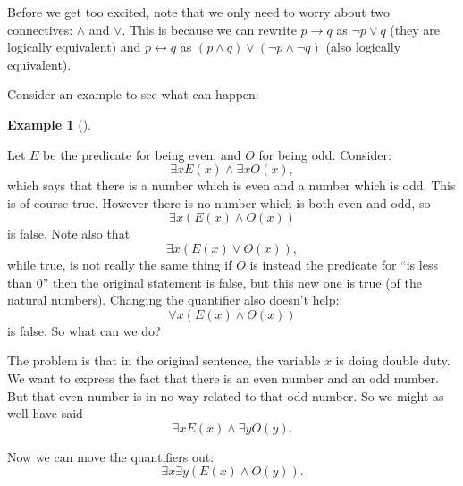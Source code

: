 \documentclass[10pt,]{book}
\theoremstyle{plain}
\theoremstyle{definition}
\newtheorem{example}[theorem]{Example}
\theoremstyle{definition}
\theoremstyle{definition}
\numberwithin{equation}{chapter}
\def\iff{\leftrightarrow}
\def\imp{\rightarrow}
\begin{document}
      Before we get too excited, note that we only need to worry about two connectives: \(\wedge\) and \(\vee\). This is because we can rewrite \(p \imp q\) as \(\neg p \vee q\) (they are logically equivalent) and \(p \iff q\) as \((p \wedge q) \vee (\neg p \wedge \neg q)\) (also logically equivalent).
\par

      Consider an example to see what can happen:
\begin{example}[]\label{example-87}

          Let \(E\) be the predicate for being even, and \(O\) for being odd. Consider:
          \begin{equation*}
            \exists x E(x) \wedge \exists x O(x),
          \end{equation*}
          which says that there is a number which is even and a number which is odd. This is of course true. However there is no number which is both even and odd, so
          \begin{equation*}
            \exists x (E(x) \wedge O(x))
          \end{equation*}
          is false. Note also that
          \begin{equation*}
            \exists x (E(x) \vee O(x)),
          \end{equation*}
          while true, is not really the same thing \textendash{} if \(O\) is instead the predicate for ``is less than 0'' then the original statement is false, but this new one is true (of the natural numbers). Changing the quantifier also doesn't help:
          \begin{equation*}
            \forall x (E(x) \wedge O(x))
          \end{equation*}
          is false. So what can we do?
\par

          The problem is that in the original sentence, the variable \(x\) is doing double duty. We want to express the fact that there is an even number and an odd number. But that even number is in no way related to that odd number. So we might as well have said
          \begin{equation*}
            \exists x E(x) \wedge \exists y O(y).
          \end{equation*}
\par

          Now we can move the quantifiers out:
          \begin{equation*}
            \exists x \exists y (E(x) \wedge O(y)).
          \end{equation*}
\end{example}
\par
\end{document}

